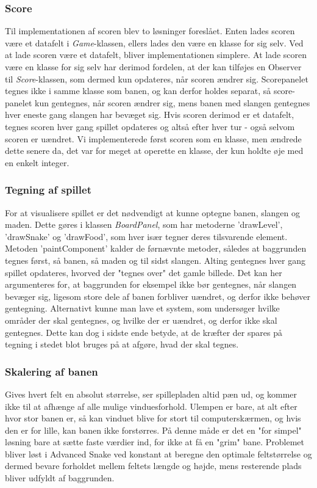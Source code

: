 \subsubsection{Score}
Til implementationen af scoren blev to løsninger foreslået. Enten lades scoren være et datafelt i \textit{Game}-klassen, ellers lades den være en klasse for sig selv. Ved at lade scoren være et datafelt, bliver implementationen simplere. At lade scoren være en klasse for sig selv har derimod fordelen, at der kan tilføjes en Observer til \textit{Score}-klassen, som dermed kun opdateres, når scoren ændrer sig. Scorepanelet tegnes ikke i samme klasse som banen, og kan derfor holdes separat, så score-panelet kun gentegnes, når scoren ændrer sig, mens banen med slangen gentegnes hver eneste gang slangen har bevæget sig. Hvis scoren derimod er et datafelt, tegnes scoren hver gang spillet opdateres og altså efter hver tur - også selvom scoren er uændret. Vi implementerede først scoren som en klasse, men ændrede dette senere da, det var for meget at operette en klasse, der kun holdte øje med en enkelt integer.

\subsubsection{Tegning af spillet}
For at visualisere spillet er det nødvendigt at kunne optegne banen, slangen og maden. Dette gøres i klassen \textit{BoardPanel}, som har metoderne 'drawLevel', 'drawSnake' og 'drawFood', som hver især tegner deres tilsvarende element. Metoden 'paintComponent' kalder de førnævnte metoder, således at baggrunden tegnes først, så banen, så maden og til sidst slangen. Alting gentegnes hver gang spillet opdateres, hvorved der "tegnes over" det gamle billede. Det kan her argumenteres for, at baggrunden for eksempel ikke bør gentegnes, når slangen bevæger sig, ligesom store dele af banen forbliver uændret, og derfor ikke behøver gentegning. Alternativt kunne man lave et system, som undersøger hvilke områder der skal gentegnes, og hvilke der er uændret, og derfor ikke skal gentegnes. Dette kan dog i sidste ende betyde, at de kræfter der spares på tegning i stedet blot bruges på at afgøre, hvad der skal tegnes.

\subsubsection{Skalering af banen}
Gives hvert felt en absolut størrelse, ser spillepladen altid pæn ud, og kommer ikke til at afhænge af alle mulige vinduesforhold. Ulempen er bare, at alt efter hvor stor banen er, så kan vinduet blive for stort til computerskærmen, og hvis den er for lille, kan banen ikke forstørres. På denne måde er det en "for simpel" løsning bare at sætte faste værdier ind, for ikke at få en "grim" bane.
Problemet bliver løst i Advanced Snake ved konstant at beregne den optimale feltstørrelse og dermed bevare forholdet mellem feltets længde og højde, mens resterende plads bliver udfyldt af baggrunden.

